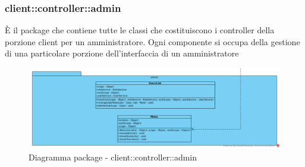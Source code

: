 \subsubsection{client::controller::admin}
È il package che contiene tutte le classi che costituiscono i controller della porzione client per un amministratore. Ogni componente si occupa della gestione di una particolare porzione dell'interfaccia di un amministratore\begin{center}
		\begin{figure}[H]
			\centering \includegraphics[scale=4, max width=\textwidth, max height=\myheight]{../img/diagrammiClassi/client/controller/admin.png}
			\caption{Diagramma package - client::controller::admin}
		\end{figure}
	\end{center}\hypertarget{client::controller::admin::UsersList}{}
